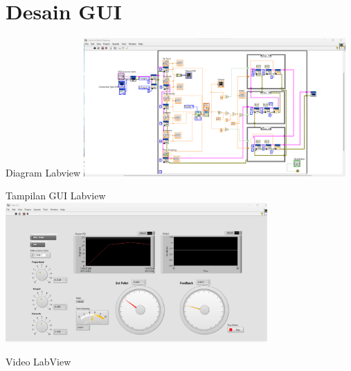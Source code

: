 \documentclass[10pt,xcolor={dvipsnames}]{beamer}
\begin{document}
\section{Desain GUI}

\begin{frame}{Diagram Labview}
	\centering
	\includegraphics[width=10cm]{Gambar Lain/labview1.png}
\end{frame}

\begin{frame}{Tampilan GUI Labview}
	\centering
	\includegraphics[width=10cm]{Gambar Lain/labview2.png}
\end{frame}

\begin{frame}{Video LabView}
	\centering	
\end{frame}
\end{document}
